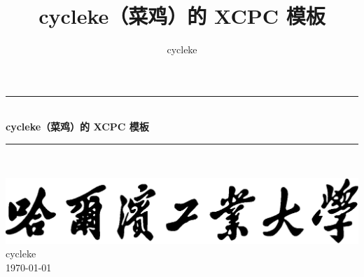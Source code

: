 \documentclass[twoside]{article}
\title{cycleke（菜鸡）的 XCPC 模板}
\author{cycleke}
\newcommand{\HRule}{\rule{\linewidth}{0.5mm}}
\begin{document}
\begin{titlepage}
  \begin{center}
    \HRule{} \\ [1cm]
    \textbf{\Huge{cycleke（菜鸡）的 XCPC 模板}} \\ [0.5cm]
    \HRule{} \\ [4cm]

    \vfill
    \begin{figure}[H]
      \centering
       \quad
    \end{figure}
    \includegraphics[width=.55\linewidth]{school} \\ [2cm]
    \LARGE{cycleke} \\ [1cm]
    \Large{\today}
  \end{center}
  \clearpage
\end{titlepage}

\tableofcontents\clearpage
\pagestyle{fancy}
\lfoot{}
\cfoot{\thepage}\rfoot{}
\setcounter{page}{1}
\clearpage









\end{document}
